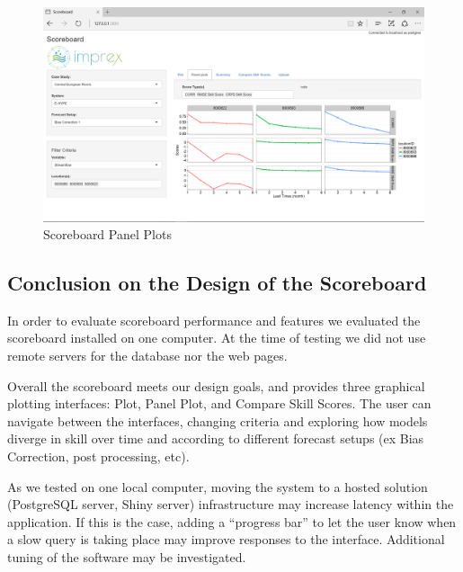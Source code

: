 \documentclass[logos,parttoc,morelanguage=french,morelanguage=german,draft]{orsay-memoire}
\begin{document}
\begin{figure}[h]
\centering
\includegraphics[width=0.80\linewidth]{images/isb7.png}
  \caption{Scoreboard Panel Plots}
  \label{fig:isb7}
\end{figure}


%


\subsection{Conclusion on the Design of the Scoreboard}

In order to evaluate scoreboard performance and features we evaluated the scoreboard installed on one computer. At the time of testing we did not use remote servers for the database nor the web pages.

Overall the scoreboard meets our design goals, and provides three graphical plotting interfaces: Plot, Panel Plot, and Compare Skill Scores. The user can navigate between the interfaces, changing criteria and exploring how models diverge in skill over time and according to different forecast setups (ex Bias Correction, post processing, etc).

As we tested on one local computer, moving the system to a hosted solution (PostgreSQL server, Shiny server) infrastructure may increase latency within the application. If this is the case, adding a ``progress bar'' to let the user know when a slow query is taking place may improve responses to the interface. Additional tuning of the software may be investigated.
\end{document}
